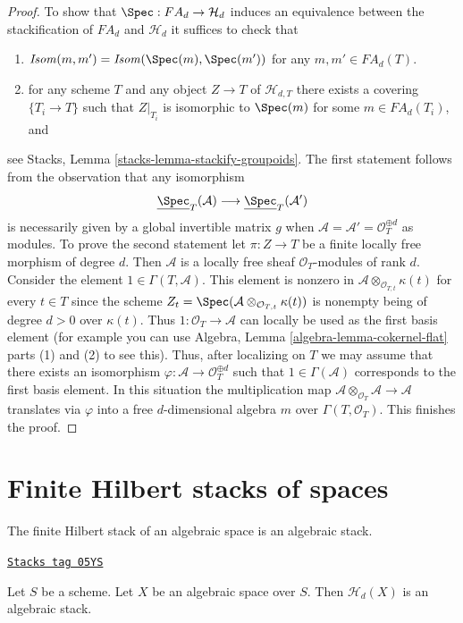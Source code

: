\begin{proof}
\medskip\noindent
To show that $\Spec : FA_d \to \mathcal{H}_d$ induces an equivalence
between the stackification of $FA_d$ and $\mathcal{H}_d$ it suffices to
check that
\begin{enumerate}
\item $\mathit{Isom}(m, m') = \mathit{Isom}(\Spec(m), \Spec(m'))$
for any $m, m' \in FA_d(T)$.
\item for any scheme $T$ and any object $Z \to T$ of $\mathcal{H}_{d, T}$
there exists a covering $\{T_i \to T\}$ such that $Z|_{T_i}$ is
isomorphic to $\Spec(m)$ for some $m \in FA_d(T_i)$, and
\end{enumerate}
see
Stacks, Lemma \ref{stacks-lemma-stackify-groupoids}.
The first statement follows from the observation that any isomorphism
$$
\underline{\Spec}_T(\mathcal{A})
\longrightarrow
\underline{\Spec}_T(\mathcal{A}')
$$
is necessarily given by a global invertible matrix $g$ when
$\mathcal{A} = \mathcal{A}' = \mathcal{O}_T^{\oplus d}$ as modules.
To prove the second statement let $\pi : Z \to T$ be a finite
locally free morphism of degree $d$. Then $\mathcal{A}$ is a locally
free sheaf $\mathcal{O}_T$-modules of rank $d$.
Consider the element $1 \in \Gamma(T, \mathcal{A})$. This element is
nonzero in $\mathcal{A} \otimes_{\mathcal{O}_{T, t}} \kappa(t)$
for every $t \in T$ since the scheme
$Z_t = \Spec(\mathcal{A} \otimes_{\mathcal{O}_{T, t}} \kappa(t))$
is nonempty being of degree $d > 0$ over $\kappa(t)$. Thus
$1 : \mathcal{O}_T \to \mathcal{A}$ can locally be used as the first
basis element (for example you can use
Algebra, Lemma \ref{algebra-lemma-cokernel-flat} parts (1) and (2)
to see this). Thus, after localizing on
$T$ we may assume that there exists an isomorphism
$\varphi : \mathcal{A} \to \mathcal{O}_T^{\oplus d}$
such that $1 \in \Gamma(\mathcal{A})$ corresponds to the first basis element.
In this situation the multiplication map
$\mathcal{A} \otimes_{\mathcal{O}_T} \mathcal{A} \to \mathcal{A}$
translates via $\varphi$ into a free $d$-dimensional algebra $m$ over
$\Gamma(T, \mathcal{O}_T)$. This finishes the proof.
\end{proof}

\section{Finite Hilbert stacks of spaces}
\label{criteria-section-spaces-hilbert}
The finite Hilbert stack of an algebraic space is an algebraic stack.

\begin{lemma}
\label{criteria-lemma-hilbert-stack-of-space}
\href{https://stacks.math.columbia.edu/tag/05YS}{\texttt{Stacks tag 05YS}}

Let $S$ be a scheme.
Let $X$ be an algebraic space over $S$.
Then $\mathcal{H}_d(X)$ is an algebraic stack.
\end{lemma}

